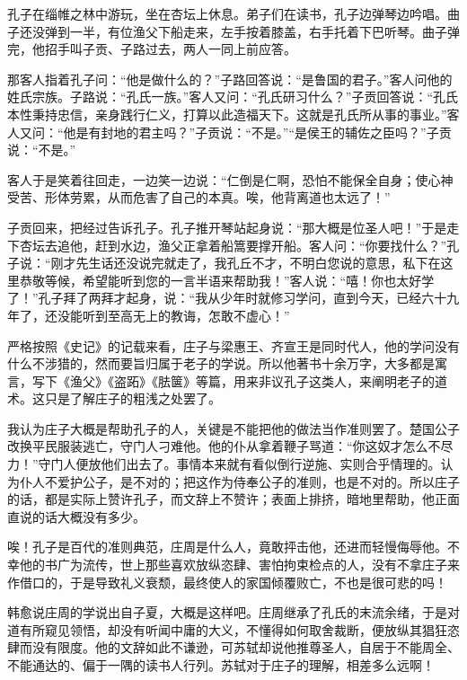 \documentclass[11pt,a4paper]{ctexart}
\begin{document}
\begin{translation}
孔子在缁帷之林中游玩，坐在杏坛上休息。弟子们在读书，孔子边弹琴边吟唱。曲子还没弹到一半，有位渔父下船走来，左手按着膝盖，右手托着下巴听琴。曲子弹完，他招手叫子贡、子路过去，两人一同上前应答。

那客人指着孔子问：“他是做什么的？”子路回答说：“是鲁国的君子。”客人问他的姓氏宗族。子路说：“孔氏一族。”客人又问：“孔氏研习什么？”子贡回答说：“孔氏本性秉持忠信，亲身践行仁义，打算以此造福天下。这就是孔氏所从事的事业。”客人又问：“他是有封地的君主吗？”子贡说：“不是。”“是侯王的辅佐之臣吗？”子贡说：“不是。”

客人于是笑着往回走，一边笑一边说：“仁倒是仁啊，恐怕不能保全自身；使心神受苦、形体劳累，从而危害了自己的本真。唉，他背离道也太远了！”

子贡回来，把经过告诉孔子。孔子推开琴站起身说：“那大概是位圣人吧！”于是走下杏坛去追他，赶到水边，渔父正拿着船篙要撑开船。客人问：“你要找什么？”孔子说：“刚才先生话还没说完就走了，我孔丘不才，不明白您说的意思，私下在这里恭敬等候，希望能听到您的一言半语来帮助我！”客人说：“嘻！你也太好学了！”孔子拜了两拜才起身，说：“我从少年时就修习学问，直到今天，已经六十九年了，还没能听到至高无上的教诲，怎敢不虚心！”
\end{translation}

\begin{translation}
严格按照《史记》的记载来看，庄子与梁惠王、齐宣王是同时代人，他的学问没有什么不涉猎的，然而要旨归属于老子的学说。所以他著书十余万字，大多都是寓言，写下《渔父》《盗跖》《胠箧》等篇，用来非议孔子这类人，来阐明老子的道术。这只是了解庄子的粗浅之处罢了。

我认为庄子大概是帮助孔子的人，关键是不能把他的做法当作准则罢了。楚国公子改换平民服装逃亡，守门人刁难他。他的仆从拿着鞭子骂道：“你这奴才怎么不尽力！”守门人便放他们出去了。事情本来就有看似倒行逆施、实则合乎情理的。认为仆人不爱护公子，是不对的；把这作为侍奉公子的准则，也是不对的。所以庄子的话，都是实际上赞许孔子，而文辞上不赞许；表面上排挤，暗地里帮助，他正面直说的话大概没有多少。
\end{translation}

\begin{translation}
唉！孔子是百代的准则典范，庄周是什么人，竟敢抨击他，还进而轻慢侮辱他。不幸他的书广为流传，世上那些喜欢放纵恣肆、害怕拘束检点的人，没有不拿庄子来作借口的，于是导致礼义衰颓，最终使人的家国倾覆败亡，不也是很可悲的吗！
\end{translation}

\begin{translation}
韩愈说庄周的学说出自子夏，大概是这样吧。庄周继承了孔氏的末流余绪，于是对道有所窥见领悟，却没有听闻中庸的大义，不懂得如何取舍裁断，便放纵其猖狂恣肆而没有限度。他的文辞如此不谦逊，可苏轼却说他推尊圣人，自居于不能周全、不能通达的、偏于一隅的读书人行列。苏轼对于庄子的理解，相差多么远啊！
\end{translation}
\end{document}
